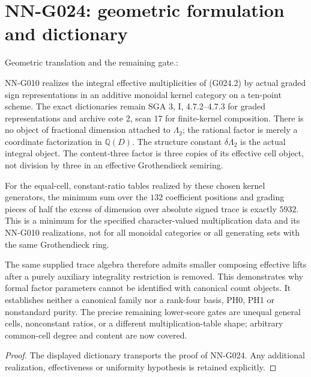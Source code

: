 \section{NN-G024: geometric formulation and dictionary}
\begin{geometricstatement}[NN-G024]
Geometric translation and the remaining gate.:

NN-G010 realizes the integral effective multiplicities of
(G024.2) by actual graded sign representations in an
additive monoidal kernel category on a ten-point scheme.
The exact dictionaries remain SGA 3, I, 4.7.2--4.7.3
for graded representations and archive cote 2, scan 17
for finite-kernel composition. There is no object of
fractional dimension attached to $\Lambda_2$; the rational
factor is merely a coordinate factorization in $\mathbb Q(D)$.
The structure constant $\delta\Lambda_2$ is the actual
integral object. The content-three factor is three copies
of its effective cell object, not division by three in
an effective Grothendieck semiring.

For the equal-cell, constant-ratio tables realized by these
chosen kernel generators, the minimum sum over the $132$
coefficient positions and grading pieces of half the excess of dimension over
absolute signed trace is exactly $5932$. This is a minimum
for the specified character-valued multiplication data and
its NN-G010 realizations, not for all monoidal categories
or all generating sets with the same Grothendieck ring.

The same supplied trace algebra therefore admits smaller
composing effective lifts after a purely auxiliary
integrality restriction is removed. This demonstrates
why formal factor parameters cannot be identified with
canonical count objects. It establishes neither a
canonical family nor a rank-four basis, PH0, PH1 or
nonstandard purity. The precise remaining lower-score
gates are unequal general cells, nonconstant ratios,
or a different multiplication-table shape; arbitrary
common-cell degree and content are now covered.


\end{geometricstatement}
\begin{proof} The displayed dictionary transports the proof of NN-G024. Any additional realization, effectiveness or uniformity hypothesis is retained explicitly.\end{proof}


